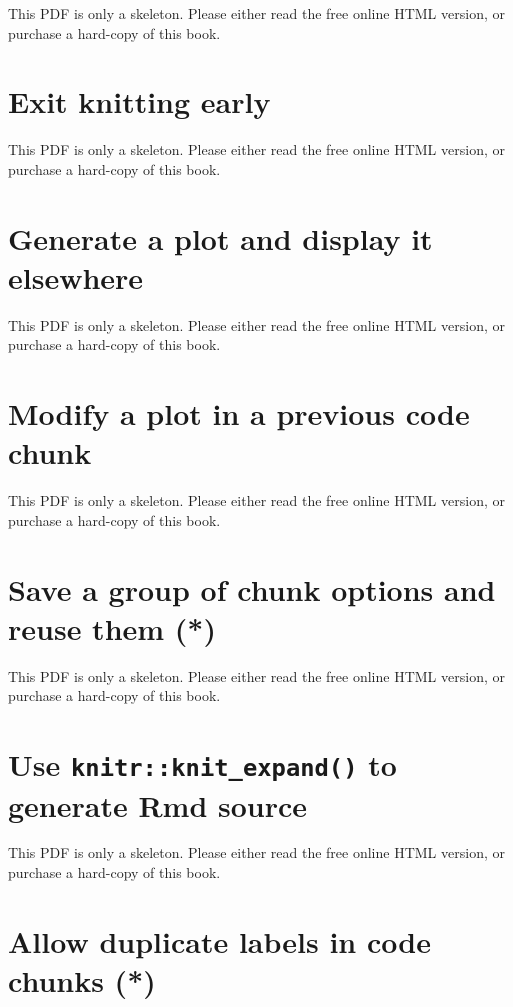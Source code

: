 \documentclass[
  11pt,
]{krantz}
\begin{document}
This PDF is only a skeleton. Please either read the free online HTML version, or purchase a hard-copy of this book.

\section{Exit knitting early}\label{knit-exit}

This PDF is only a skeleton. Please either read the free online HTML version, or purchase a hard-copy of this book.

\section{Generate a plot and display it elsewhere}\label{fig-chunk}

This PDF is only a skeleton. Please either read the free online HTML version, or purchase a hard-copy of this book.

\section{Modify a plot in a previous code chunk}\label{global-device}

This PDF is only a skeleton. Please either read the free online HTML version, or purchase a hard-copy of this book.

\section{Save a group of chunk options and reuse them (*)}\label{opts-template}

This PDF is only a skeleton. Please either read the free online HTML version, or purchase a hard-copy of this book.

\section{\texorpdfstring{Use \texttt{knitr::knit\_expand()} to generate Rmd source}{Use knitr::knit\_expand() to generate Rmd source}}\label{knit-expand}

This PDF is only a skeleton. Please either read the free online HTML version, or purchase a hard-copy of this book.

\section{Allow duplicate labels in code chunks (*)}\label{duplicate-label}
\end{document}

